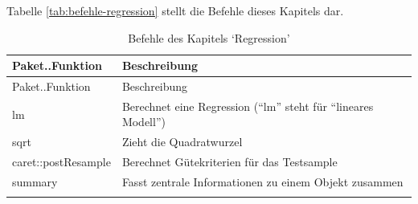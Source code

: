 \documentclass[12pt,ngerman,]{book}
\theoremstyle{definition}
\theoremstyle{definition}
\theoremstyle{remark}
\begin{document}
Tabelle \ref{tab:befehle-regression} stellt die Befehle dieses Kapitels
dar.

\begin{longtable}[]{@{}ll@{}}
\caption{Befehle des Kapitels `Regression'}\tabularnewline
\toprule
\begin{minipage}[b]{0.34\columnwidth}\raggedright\strut
Paket..Funktion\strut
\end{minipage} & \begin{minipage}[b]{0.43\columnwidth}\raggedright\strut
Beschreibung\strut
\end{minipage}\tabularnewline
\midrule
\endfirsthead
\toprule
\begin{minipage}[b]{0.34\columnwidth}\raggedright\strut
Paket..Funktion\strut
\end{minipage} & \begin{minipage}[b]{0.43\columnwidth}\raggedright\strut
Beschreibung\strut
\end{minipage}\tabularnewline
\midrule
\endhead
\begin{minipage}[t]{0.34\columnwidth}\raggedright\strut
lm\strut
\end{minipage} & \begin{minipage}[t]{0.43\columnwidth}\raggedright\strut
Berechnet eine Regression (``lm'' steht für ``lineares Modell'')\strut
\end{minipage}\tabularnewline
\begin{minipage}[t]{0.34\columnwidth}\raggedright\strut
sqrt\strut
\end{minipage} & \begin{minipage}[t]{0.43\columnwidth}\raggedright\strut
Zieht die Quadratwurzel\strut
\end{minipage}\tabularnewline
\begin{minipage}[t]{0.34\columnwidth}\raggedright\strut
caret::postResample\strut
\end{minipage} & \begin{minipage}[t]{0.43\columnwidth}\raggedright\strut
Berechnet Gütekriterien für das Testsample\strut
\end{minipage}\tabularnewline
\begin{minipage}[t]{0.34\columnwidth}\raggedright\strut
summary\strut
\end{minipage} & \begin{minipage}[t]{0.43\columnwidth}\raggedright\strut
Fasst zentrale Informationen zu einem Objekt zusammen\strut
\end{minipage}\tabularnewline
\begin{minipage}[t]{0.34\columnwidth}\raggedright\strut

\end{minipage}
\end{longtable}
\end{document}
